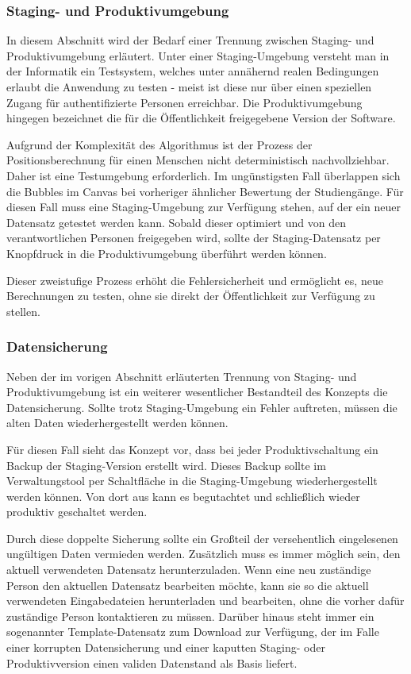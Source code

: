 \subsubsection{Staging- und Produktivumgebung}
In diesem Abschnitt wird der Bedarf einer Trennung zwischen Staging- und Produktivumgebung erläutert. Unter einer Staging-Umgebung versteht man in der Informatik ein Testsystem, welches unter annähernd realen Bedingungen erlaubt die Anwendung zu testen - meist ist diese nur über einen speziellen Zugang für authentifizierte Personen erreichbar. Die Produktivumgebung hingegen bezeichnet die für die Öffentlichkeit freigegebene Version der Software.

Aufgrund der Komplexität des Algorithmus ist der Prozess der Positionsberechnung für einen Menschen nicht deterministisch nachvollziehbar. Daher ist eine Testumgebung erforderlich. Im ungünstigsten Fall überlappen sich die Bubbles im Canvas bei vorheriger ähnlicher Bewertung der Studiengänge. Für diesen Fall muss eine Staging-Umgebung zur Verfügung stehen, auf der ein neuer Datensatz getestet werden kann. Sobald dieser optimiert und von den verantwortlichen Personen freigegeben wird, sollte der Staging-Datensatz per Knopfdruck in die Produktivumgebung überführt werden können.

Dieser zweistufige Prozess erhöht die Fehlersicherheit und ermöglicht es, neue Berechnungen zu testen, ohne sie direkt der Öffentlichkeit zur Verfügung zu stellen.

\subsubsection{Datensicherung}
Neben der im vorigen Abschnitt erläuterten Trennung von Staging- und Produktivumgebung ist ein weiterer wesentlicher Bestandteil des Konzepts die Datensicherung. Sollte trotz Staging-Umgebung ein Fehler auftreten, müssen die alten Daten wiederhergestellt werden können.

Für diesen Fall sieht das Konzept vor, dass bei jeder Produktivschaltung ein Backup der Staging-Version erstellt wird. Dieses Backup sollte im Verwaltungstool per Schaltfläche in die Staging-Umgebung wiederhergestellt werden können. Von dort aus kann es begutachtet und schließlich wieder produktiv geschaltet werden.

Durch diese doppelte Sicherung sollte ein Großteil der versehentlich eingelesenen ungültigen Daten vermieden werden. Zusätzlich muss es immer möglich sein, den aktuell verwendeten Datensatz herunterzuladen. Wenn eine neu zuständige Person den aktuellen Datensatz bearbeiten möchte, kann sie so die aktuell verwendeten Eingabedateien herunterladen und bearbeiten, ohne die vorher dafür zuständige Person kontaktieren zu müssen. Darüber hinaus steht immer ein sogenannter Template-Datensatz zum Download zur Verfügung, der im Falle einer korrupten Datensicherung und einer kaputten Staging- oder Produktivversion einen validen Datenstand als Basis liefert.
